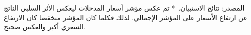 المصدر: نتائج الاستبيان.\
* تم عكس مؤشر أسعار المدخلات ليعكس الأثر السلبي الناتج عن ارتفاع الأسعار على المؤشر الإجمالي. لذلك فكلما كان المؤشر منخفضا كان الارتفاع السعري أكبر والعكس صحيح.
